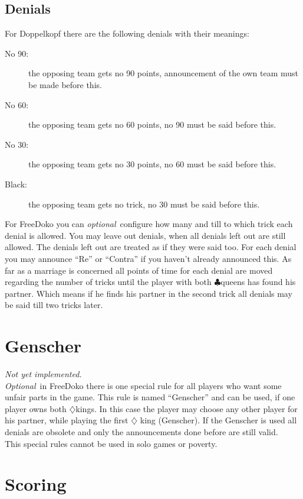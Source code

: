 \documentclass[12pt,a4paper]{article}
\newcommand{\kreuz}{$\clubsuit$}
\newcommand{\karo}{$\diamondsuit$}
\newcommand{\optional}{\textit{optional}}
\newcommand{\Optional}{\textit{Optional}}
\newcommand{\NotYet}{\textit{Not yet implemented.\\}}
\begin{document}
\subsection{Denials} For
Doppelkopf there are the following denials with their meanings:
\begin{description}
\item[No 90:] the opposing team gets no 90 points, announcement of the own team must be made before this.
\item[No 60:] the opposing team gets no 60 points, no 90 must be said before this.
\item[No 30:] the opposing team gets no 30 points, no 60 must be said before this.
\item[Black:] the opposing team gets no trick, no 30 must be said before this.
\end{description}
For FreeDoko you can \optional\ configure how many and till to
which trick each denial is allowed. You may leave out denials,
when all denials left out are still  allowed. The denials left out
are treated as if they were said too. For each denial you may
announce "`Re"' or "`Contra"' if you haven't already announced
this. As far as a marriage is concerned all points of time for
each denial are moved regarding the number of tricks until the
player with both \kreuz queens has found his partner.
 Which means if he finds his partner in the second
trick all denials may be said till two tricks later.
\section{Genscher} \NotYet \Optional\ in FreeDoko there is one
special rule for all players who want some unfair parts in the
game. This rule is named "`Genscher"' and can be used, if one
player owns both \karo kings. In this case the player may choose
any other player for his partner, while playing the first \karo
king (Genscher).
If the Genscher is used all denials are obsolete and only the announcements done before are still valid.\\
This special rules cannot be used in solo games or poverty.
\section{Scoring}
\end{document}
